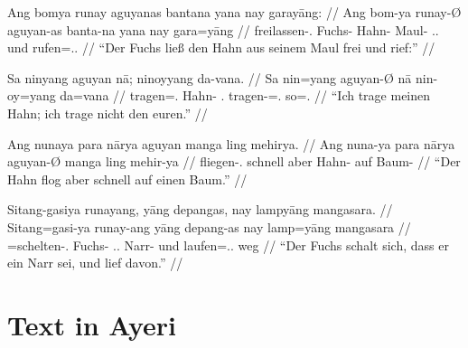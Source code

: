 \documentclass[12pt,paper=a4]{scrartcl}
\newcommand{\TsgM}{{\Tsg}.{\M}}
\begin{document}
\pex %
\a\begingl
	\gla Ang bomya runay aguyanas bantana yana nay garayāng: //
	\glb Ang bom-ya runay-Ø aguyan-as banta-na yana nay gara=yāng //
	\glc \AgtT{} freilassen-\TsgM{} Fuchs-\Top{} Hahn-\Parg{} Maul-\Gen{} \TsgM{}.\Gen{} und rufen=\TsgM{}.\Aarg{} //
	\glft \enquote{Der Fuchs ließ den Hahn aus seinem Maul frei und rief:} //
\endgl

\a\begingl
	\gla Sa ninyang aguyan nā; ninoyyang da-vana. //
	\glb Sa nin=yang aguyan-Ø nā nin-oy=yang da=vana //
	\glc \PatT{} tragen=\Fsg{}.\Aarg{} Hahn-\Top{} \Fsg{}.\Gen{} tragen-\Neg{}=\Fsg{}.\Aarg{} so=\Spl{}.\Gen{} //
	\glft \enquote{Ich trage meinen Hahn; ich trage nicht den euren.} //
\endgl

\xe

\pex %
\a\begingl
	\gla Ang nunaya para nārya aguyan manga ling mehirya. //
	\glb Ang nuna-ya para nārya aguyan-Ø manga ling mehir-ya //
	\glc \AgtT{} fliegen-\TsgM{} schnell aber Hahn-\Top{} \Dyn{} auf Baum-\Loc{} //
	\glft \enquote{Der Hahn flog aber schnell auf einen Baum.} //
\endgl

\a\begingl
	\gla Sitang-gasiya runayang, yāng depangas, nay lampyāng mangasara. //
	\glb Sitang=gasi-ya runay-ang yāng depang-as nay lamp=yāng mangasara //
	\glc \Refl{}=schelten-\TsgM{} Fuchs-\Aarg{} \TsgM{}.\Aarg{} Narr-\Parg{} und laufen=\TsgM{}.\Aarg{} weg //
	\glft \enquote{Der Fuchs schalt sich, dass er ein Narr sei, und lief davon.} //
\endgl

\xe

\section{Text in Ayeri}
\end{document}
